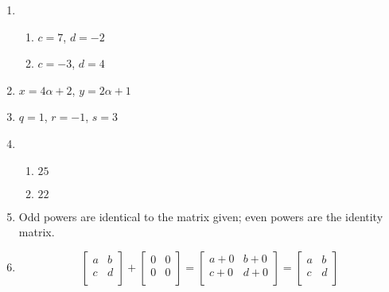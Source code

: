 \documentclass[11pt]{article}
\begin{document}
\begin{enumerate}
\item 
\begin{enumerate}
\item $c=7$, $d=-2$
\item $c=-3$, $d=4$
\end{enumerate}


\item $x=4\alpha + 2$, $y=2\alpha + 1$


\item $q=1$, $r=-1$, $s=3$


\item 
\begin{enumerate}
\item $25$
\item $22$
\end{enumerate}




\item Odd powers are identical to the matrix given; even powers are the identity matrix.


\item 


\[
\left[\begin{array}{cc}
a & b \\
c & d \\
\end{array}\right]
+
\left[\begin{array}{cc}
0 & 0 \\
0 & 0 \\
\end{array}\right]
=
\left[\begin{array}{cc}
a+0 & b+0 \\
c+0 & d+0 \\
\end{array}\right]
=
\left[\begin{array}{cc}
a & b \\
c & d \\
\end{array}\right]
\]


\end{enumerate}
\end{document}
